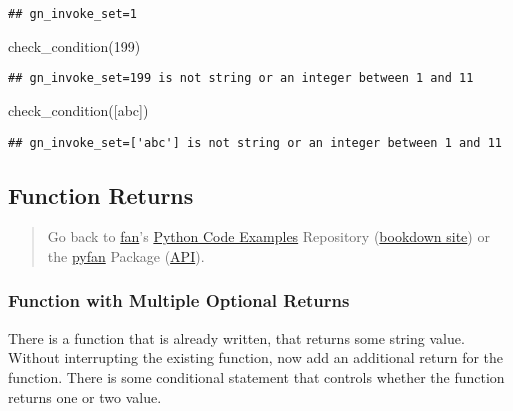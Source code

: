 \documentclass[
]{book}
\newenvironment{Shaded}{\begin{snugshade}}{\end{snugshade}}
\newcommand{\DecValTok}[1]{\textcolor[rgb]{0.00,0.00,0.81}{#1}}
\newcommand{\NormalTok}[1]{#1}
\newcommand{\StringTok}[1]{\textcolor[rgb]{0.31,0.60,0.02}{#1}}
\begin{document}
\begin{verbatim}
## gn_invoke_set=1
\end{verbatim}

\begin{Shaded}
\begin{Highlighting}[]
\NormalTok{check\_condition(}\DecValTok{199}\NormalTok{)}
\end{Highlighting}
\end{Shaded}

\begin{verbatim}
## gn_invoke_set=199 is not string or an integer between 1 and 11
\end{verbatim}

\begin{Shaded}
\begin{Highlighting}[]
\NormalTok{check\_condition([}\StringTok{\textquotesingle{}abc\textquotesingle{}}\NormalTok{])}
\end{Highlighting}
\end{Shaded}

\begin{verbatim}
## gn_invoke_set=['abc'] is not string or an integer between 1 and 11
\end{verbatim}

\hypertarget{function-returns}{%
\subsection{Function Returns}\label{function-returns}}

\begin{quote}
Go back to \href{http://fanwangecon.github.io/}{fan}'s \href{https://fanwangecon.github.io/Py4Econ/}{Python Code Examples} Repository (\href{https://fanwangecon.github.io/Py4Econ/bookdown}{bookdown site}) or the \href{https://pyfan.readthedocs.io/en/latest/}{pyfan} Package (\href{https://pyfan.readthedocs.io/en/latest/reference.html}{API}).
\end{quote}

\hypertarget{function-with-multiple-optional-returns}{%
\subsubsection{Function with Multiple Optional Returns}\label{function-with-multiple-optional-returns}}

There is a function that is already written, that returns some string value. Without interrupting the existing function, now add an additional return for the function. There is some conditional statement that controls whether the function returns one or two value.
\end{document}
